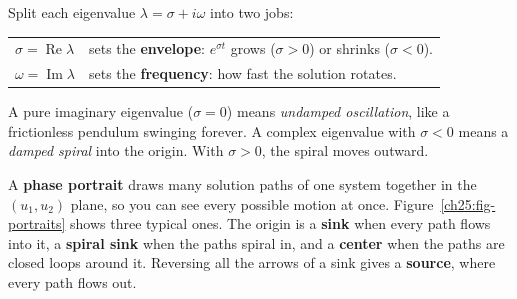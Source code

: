 \begin{intuitionbox}
Split each eigenvalue $\lambda = \sigma + i\omega$ into two jobs:
\begin{center}
\begin{tabular}{ll}
$\sigma = \operatorname{Re}\lambda$ & sets the \textbf{envelope}: $e^{\sigma t}$ grows ($\sigma>0$) or shrinks ($\sigma<0$).\\
$\omega = \operatorname{Im}\lambda$ & sets the \textbf{frequency}: how fast the solution rotates.
\end{tabular}
\end{center}
A pure imaginary eigenvalue ($\sigma=0$) means \emph{undamped oscillation}, like a
frictionless pendulum swinging forever. A complex eigenvalue with $\sigma<0$ means
a \emph{damped spiral} into the origin. With $\sigma>0$, the spiral moves outward.
\end{intuitionbox}

A \textbf{phase portrait} draws many solution paths of one system together in
the $(u_1,u_2)$ plane, so you can see every possible motion at once.
Figure~\ref{ch25:fig-portraits} shows three typical ones. The origin is a
\textbf{sink} when every path flows into it, a \textbf{spiral sink} when the
paths spiral in, and a \textbf{center} when the paths are closed loops around
it. Reversing all the arrows of a sink gives a \textbf{source}, where every path
flows out.

